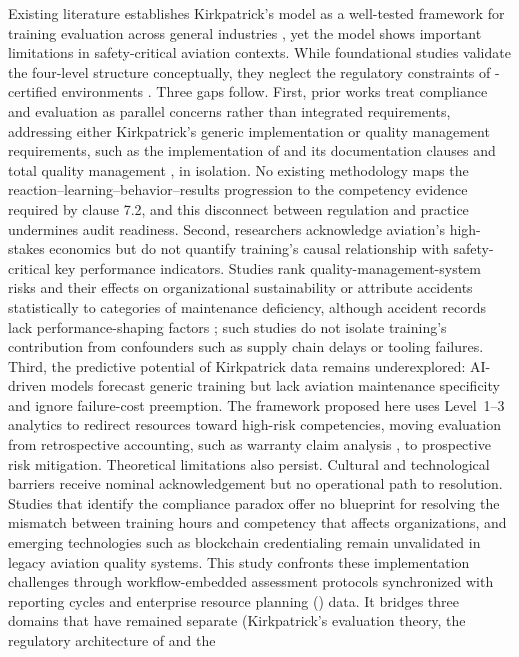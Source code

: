 Existing literature establishes Kirkpatrick's model as a well-tested framework for training evaluation across general industries \parencite{Phillips2016,BuriakAyars2019}, yet the model shows important limitations in safety-critical aviation contexts. While foundational studies validate the four-level structure conceptually, they neglect the regulatory constraints of \AS{}-certified environments \parencite{OReilly2024}. Three gaps follow. First, prior works treat compliance and evaluation as parallel concerns rather than integrated requirements, addressing either Kirkpatrick's generic implementation \parencite{Kirkpatrick2006} or quality management requirements, such as the implementation of \AS{} and its documentation clauses \parencite{YucelAyvaz2019} and total quality management \parencite{Oschman2017}, in isolation. No existing methodology maps the reaction--learning--behavior--results progression to the competency evidence required by \AS{} clause 7.2, and this disconnect between regulation and practice undermines audit readiness.  Second, researchers acknowledge aviation's high-stakes economics \parencite{Zhang2025} but do not quantify training's causal relationship with safety-critical key performance indicators. Studies rank quality-management-system risks and their effects on organizational sustainability \parencite{Pereira2017} or attribute accidents statistically to categories of maintenance deficiency, although accident records lack performance-shaping factors \parencite{Boyd2015}; such studies do not isolate training's contribution from confounders such as supply chain delays or tooling failures.  Third, the predictive potential of Kirkpatrick data remains underexplored: AI-driven models forecast generic training \ROI{} \parencite{Peterson2025} but lack aviation maintenance specificity and ignore failure-cost preemption. The framework proposed here uses Level~1--3 analytics to redirect resources toward high-risk competencies, moving evaluation from retrospective accounting, such as warranty claim analysis \parencite{Zhang2025}, to prospective risk mitigation. Theoretical limitations also persist. Cultural and technological barriers receive nominal acknowledgement \parencite{OConnor2024} but no operational path to resolution. Studies that identify the compliance paradox \parencite{Nakamura2024} offer no blueprint for resolving the mismatch between training hours and competency that affects \MRO{} organizations, and emerging technologies such as blockchain credentialing \parencite{IATABlockchain2025} remain unvalidated in legacy aviation quality systems. This study confronts these implementation challenges through workflow-embedded assessment protocols synchronized with \SMS{} reporting cycles and enterprise resource planning (\ERP{}) data. It bridges three domains that have remained separate (Kirkpatrick's evaluation theory, the regulatory architecture of \AS{} and the 